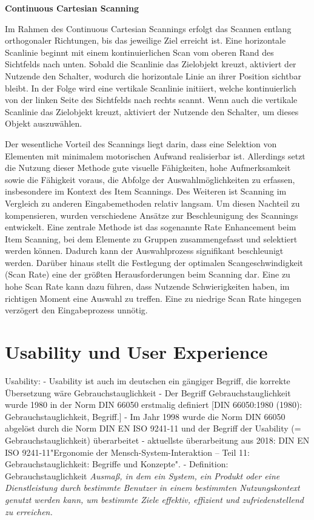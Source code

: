 {\normalfont \bfseries Continuous Cartesian Scanning}

Im Rahmen des Continuous Cartesian Scannings erfolgt das Scannen entlang orthogonaler Richtungen, bis das jeweilige Ziel erreicht ist. Eine horizontale Scanlinie beginnt mit einem kontinuierlichen Scan vom oberen Rand des Sichtfelds nach unten.  
Sobald die Scanlinie das Zielobjekt kreuzt, aktiviert der Nutzende den Schalter, wodurch die horizontale Linie an ihrer Position sichtbar bleibt. In der Folge wird eine vertikale Scanlinie initiiert, welche kontinuierlich von der linken Seite des Sichtfelds nach rechts scannt. Wenn auch die vertikale Scanlinie das Zielobjekt kreuzt, aktiviert der Nutzende den Schalter, um dieses Objekt auszuwählen.

Der wesentliche Vorteil des Scannings liegt darin, dass eine Selektion von Elementen mit minimalem motorischen Aufwand realisierbar ist. Allerdings setzt die Nutzung dieser Methode gute visuelle Fähigkeiten, hohe Aufmerksamkeit sowie die Fähigkeit voraus, die Abfolge der Auswahlmöglichkeiten zu erfassen, insbesondere im Kontext des Item Scannings. Des Weiteren ist Scanning im Vergleich zu anderen Eingabemethoden relativ langsam. Um diesen Nachteil zu kompensieren, wurden verschiedene Ansätze zur Beschleunigung des Scannings entwickelt. Eine zentrale Methode ist das sogenannte Rate Enhancement beim Item Scanning, bei dem Elemente zu Gruppen zusammengefasst und selektiert werden können. Dadurch kann der Auswahlprozess signifikant beschleunigt werden. 
Darüber hinaus stellt die Festlegung der optimalen Scangeschwindigkeit (Scan Rate) eine der größten Herausforderungen beim Scanning dar. Eine zu hohe Scan Rate kann dazu führen, dass Nutzende Schwierigkeiten haben, im richtigen Moment eine Auswahl zu treffen. Eine zu niedrige Scan Rate hingegen verzögert den Eingabeprozess unnötig.  

\section{Usability und User Experience}

Usability:
- Usability ist auch im deutschen ein gängiger Begriff, die korrekte Übersetzung wäre Gebrauchstauglichkeit
- Der Begriff Gebrauchstauglichkeit wurde 1980 in der Norm DIN 66050 erstmalig definiert [DIN 66050:1980 (1980): Gebrauchstauglichkeit, Begriff.]
- Im Jahr 1998 wurde die Norm DIN 66050 abgelöst durch die Norm DIN EN ISO 9241-11 und der Begriff der Usability (= Gebrauchstauglichkeit) überarbeitet
- aktuellste überarbeitung aus 2018: DIN EN ISO 9241-11"Ergonomie der Mensch-System-Interaktion – Teil 11: Gebrauchstauglichkeit: Begriffe und Konzepte". 
- Definition: Gebrauchstauglichkeit
\textit{Ausmaß, in dem ein System, ein Produkt oder eine Dienstleistung durch bestimmte Benutzer in einem bestimmten Nutzungskontext genutzt werden kann, um bestimmte Ziele effektiv, effizient und zufriedenstellend zu erreichen.}

